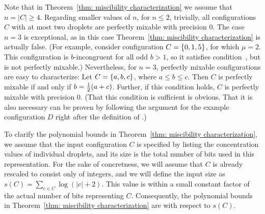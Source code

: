 Note that in Theorem~\ref{thm: miscibility characterization} we assume that $n = |C|\ge 4$.
Regarding smaller values of $n$, for $n\leq 2$, trivially, all configurations $C$ with at most two droplets
are perfectly mixable with precision $0$.
The case $n=3$ is exceptional, as in this case
Theorem~\ref{thm: miscibility characterization} is actually false. (For example,
consider configuration $C = { \left\{ 0,1,5 \right\} }$, for which $\mu = 2$. This configuration
is $b$-incongruent for all odd $b>1$, so it satisfies condition~{\MixCond}, but is
not perfectly mixable.) 
Nevertheless, for $n=3$, perfectly mixable configurations are easy to
characterize: Let $C = { \left\{ a,b,c \right\} }$, where $a\le b \le c$.
Then $C$ is perfectly mixable if and only if $b = {\textstyle\frac{1}{2}} (a+c)$.
Further, if this condition holds, $C$ is perfectly mixable with precision $0$.
(That this condition is sufficient is obvious. That it is also necessary can
be proven by following the argument 
for the example configuration $D$ right after the definition of {\PerfectMixability}.)

To clarify the polynomial bounds in Theorem~\ref{thm: miscibility characterization},
we assume that the input configuration $C$ is specified by listing the concentration
values of individual droplets, and its size is the total number of bits
used in this representation. For the sake of concretness, we will
assume that $C$ is already rescaled to consist only of integers,
and we will define the input size as $s(C) = \sum_{c\in C}\log(|c|+2)$.
This value is within a small constant factor of the actual number of
bits representing $C$. 
Consequently, the polynomial bounds in Theorem~\ref{thm: miscibility characterization} 
are with respect to $s(C)$.



